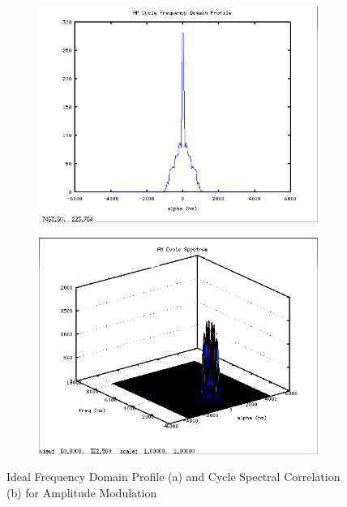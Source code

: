 \begin{figure}
\centering
\begin{subfigure}{.49\textwidth}
\centering
\includegraphics[width=\linewidth]{../img/Report_AM_Ia_Ideal.png}
  \caption{ }
\end{subfigure}
\begin{subfigure}{.49\textwidth}
  \centering
  \includegraphics[width=\linewidth]{../img/Report_AM_Sxa_Ideal.png}
  \caption{ }
\end{subfigure}
\caption{Ideal Frequency Domain Profile (a) and Cycle Spectral Correlation (b)
for Amplitude Modulation}
\label{fig:IdealAMCyclo}
\end{figure}

